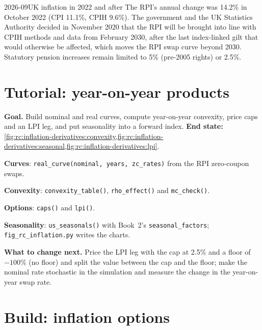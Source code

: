 \begin{dated}{2026-09}{UK inflation in 2022 and after}\label{dat:rc:inflation-derivatives:uk}
The RPI's annual change was 14.2\% in October 2022 (CPI 11.1\%, CPIH 9.6\%). The
government and the UK Statistics Authority decided in November 2020 that the RPI will
be brought into line with CPIH methods and data from February 2030, after the last
index-linked gilt that would otherwise be affected, which moves the RPI swap curve
beyond 2030. Statutory pension increases remain limited to 5\% (pre-2005 rights) or
2.5\%.
\end{dated}

\section{Tutorial: year-on-year products}\label{tut:rc:inflation-derivatives:tutorial}

\begin{tutorial}
\textbf{Goal.} Build nominal and real curves, compute year-on-year convexity, price
caps and an LPI leg, and put seasonality into a forward index. \textbf{End state:}
\cref{fig:rc:inflation-derivatives:convexity,fig:rc:inflation-derivatives:seasonal,fig:rc:inflation-derivatives:lpi}.
\begin{tutsteps}
\item \textbf{Curves}: \texttt{real\_curve(nominal, years, zc\_rates)} from the RPI
zero-coupon swaps.
\item \textbf{Convexity}: \texttt{convexity\_table()}, \texttt{rho\_effect()} and
\texttt{mc\_check()}.
\item \textbf{Options}: \texttt{caps()} and \texttt{lpi()}.
\item \textbf{Seasonality}: \texttt{us\_seasonals()} with Book~2's
\texttt{seasonal\_factors}; \texttt{fig\_rc\_inflation.py} writes the charts.
\end{tutsteps}
\textbf{What to change next.} Price the LPI leg with the cap at 2.5\% and a floor of
$-100\%$ (no floor) and split the value between the cap and the floor; make the nominal
rate stochastic in the simulation and measure the change in the year-on-year swap
rate.
\end{tutorial}

\section{Build: inflation options}\label{bld:rc:inflation-derivatives:inflopt}

